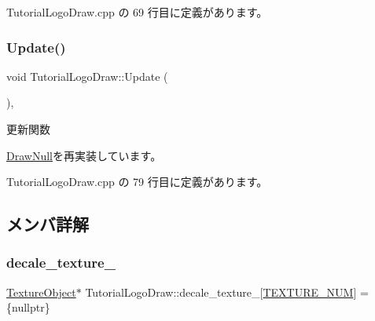  Tutorial\+Logo\+Draw.\+cpp の 69 行目に定義があります。

\mbox{\label{class_tutorial_logo_draw_af69405fcc8b20684a19e982726d93ffa}} 
\subsubsection{\texorpdfstring{Update()}{Update()}}
{\footnotesize\ttfamily void Tutorial\+Logo\+Draw\+::\+Update (\begin{DoxyParamCaption}{ }\end{DoxyParamCaption})\hspace{0.3cm}{\ttfamily [override]}, {\ttfamily [virtual]}}



更新関数 



\mbox{\hyperlink{class_draw_null_ad32a508d269de7eda8ad24ea72230464}{Draw\+Null}}を再実装しています。



 Tutorial\+Logo\+Draw.\+cpp の 79 行目に定義があります。



\subsection{メンバ詳解}
\mbox{\label{class_tutorial_logo_draw_afb10b575221308bfb7f86e276086aad6}} 
\subsubsection{\texorpdfstring{decale\+\_\+texture\+\_\+}{decale\_texture\_}}
{\footnotesize\ttfamily \mbox{\hyperlink{class_texture_object}{Texture\+Object}}$\ast$ Tutorial\+Logo\+Draw\+::decale\+\_\+texture\+\_\+\mbox{[}\mbox{\hyperlink{class_tutorial_logo_draw_aff3396323c386d499aa23e5605085ab1}{T\+E\+X\+T\+U\+R\+E\+\_\+\+N\+UM}}\mbox{]} = \{nullptr\}\hspace{0.3cm}{\ttfamily [private]}}



